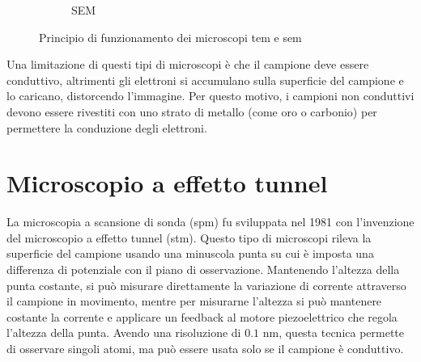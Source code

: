 \documentclass[../main.tex]{subfiles}
\begin{document}
\begin{figure}[h]
\begin{subfigure}[t]{5cm}
	\caption{SEM}
\end{subfigure}%
\caption[Principio di funzionamento dei microscopi TEM e SEM] {
	Principio di funzionamento dei microscopi \acrshort{tem} e \acrshort{sem} }
\label{fig:em_diag}
\end{figure}


Una limitazione di questi tipi di microscopi è che il campione deve essere conduttivo, altrimenti gli elettroni si accumulano sulla superficie del campione e lo caricano, distorcendo l'immagine. Per questo motivo, i campioni non conduttivi devono essere rivestiti con uno strato di metallo (come oro o carbonio) per permettere la conduzione degli elettroni.

\section{Microscopio a effetto tunnel}

La microscopia a scansione di sonda (\acrshort{spm}) fu sviluppata nel 1981 con l'invenzione del microscopio a effetto tunnel (\acrshort{stm}).\cite{ieee_spm}
Questo tipo di microscopi rileva la superficie del campione usando una minuscola punta su cui è imposta una differenza di potenziale con il piano di osservazione. Mantenendo l'altezza della punta costante, si può misurare direttamente la variazione di corrente attraverso il campione in movimento, mentre per misurarne l'altezza si può mantenere costante la corrente e applicare un feedback al motore piezoelettrico che regola l'altezza della punta. Avendo una risoluzione di $0.1$ nm, questa tecnica permette di osservare singoli atomi, ma può essere usata solo se il campione è conduttivo.\cite{bai_2000}
\end{document}
